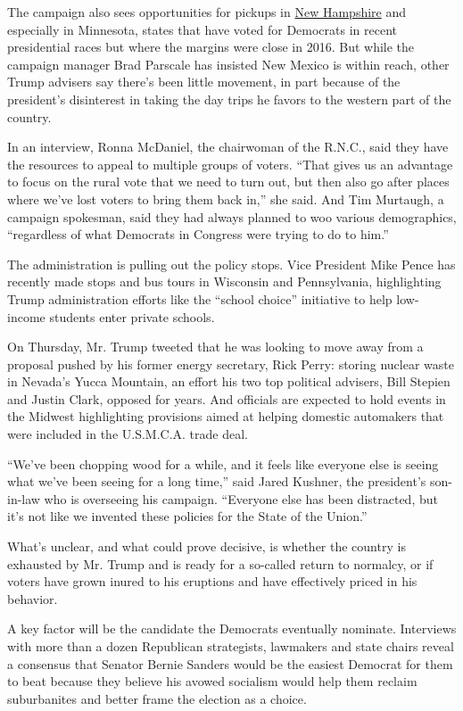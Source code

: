 The campaign also sees opportunities for pickups in
\href{https://www.nytimes.com/live/2020/new-hampshire-primary-02-11}{New
Hampshire} and especially in Minnesota, states that have voted for
Democrats in recent presidential races but where the margins were close
in 2016. But while the campaign manager Brad Parscale has insisted New
Mexico is within reach, other Trump advisers say there's been little
movement, in part because of the president's disinterest in taking the
day trips he favors to the western part of the country.

In an interview, Ronna McDaniel, the chairwoman of the R.N.C., said they
have the resources to appeal to multiple groups of voters. ``That gives
us an advantage to focus on the rural vote that we need to turn out, but
then also go after places where we've lost voters to bring them back
in,'' she said. And Tim Murtaugh, a campaign spokesman, said they had
always planned to woo various demographics, ``regardless of what
Democrats in Congress were trying to do to him.''

The administration is pulling out the policy stops. Vice President Mike
Pence has recently made stops and bus tours in Wisconsin and
Pennsylvania, highlighting Trump administration efforts like the
``school choice'' initiative to help low-income students enter private
schools.

On Thursday, Mr. Trump tweeted that he was looking to move away from a
proposal pushed by his former energy secretary, Rick Perry: storing
nuclear waste in Nevada's Yucca Mountain, an effort his two top
political advisers, Bill Stepien and Justin Clark, opposed for years.
And officials are expected to hold events in the Midwest highlighting
provisions aimed at helping domestic automakers that were included in
the U.S.M.C.A. trade deal.

``We've been chopping wood for a while, and it feels like everyone else
is seeing what we've been seeing for a long time,'' said Jared Kushner,
the president's son-in-law who is overseeing his campaign. ``Everyone
else has been distracted, but it's not like we invented these policies
for the State of the Union.''

What's unclear, and what could prove decisive, is whether the country is
exhausted by Mr. Trump and is ready for a so-called return to normalcy,
or if voters have grown inured to his eruptions and have effectively
priced in his behavior.

A key factor will be the candidate the Democrats eventually nominate.
Interviews with more than a dozen Republican strategists, lawmakers and
state chairs reveal a consensus that Senator Bernie Sanders would be the
easiest Democrat for them to beat because they believe his avowed
socialism would help them reclaim suburbanites and better frame the
election as a choice.

